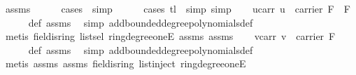 \begin{isabellebody}
\ assms{\isacharparenleft}{\kern0pt}{}{\isacharparenright}{\kern0pt}\isanewline
\ \ \ \ \isamarkupfalse%
\ {\isacharparenleft}{\kern0pt}cases\ {\isasymomega}{\isacharcomma}{\kern0pt}\ simp{\isacharparenright}{\kern0pt}\isanewline
\ \ \ \ \isamarkupfalse%
\ {\isacharparenleft}{\kern0pt}cases\ {\isachardoublequoteopen}{\isacharparenleft}{\kern0pt}tl\ {\isasymomega}{\isacharparenright}{\kern0pt}{\isachardoublequoteclose}{\isacharcomma}{\kern0pt}\ simp{\isacharcomma}{\kern0pt}\ simp{\isacharparenright}{\kern0pt}\isanewline
\isanewline
\ \ \isamarkupfalse%
\ u{\isacharunderscore}{\kern0pt}carr{\isacharcolon}{\kern0pt}\ {\isachardoublequoteopen}u\ {\isasymin}\ carrier\ F\ {\isacharminus}{\kern0pt}\ {\isacharbraceleft}{\kern0pt}{\isasymzero}\isactrlbsub F\isactrlesub {\isacharbraceright}{\kern0pt}{\isachardoublequoteclose}\isanewline
\ \ \ \ \isamarkupfalse%
\ {\isasymomega}{\isacharunderscore}{\kern0pt}def\ assms\ \isamarkupfalse%
\ {\isacharparenleft}{\kern0pt}simp\ add{\isacharcolon}{\kern0pt}bounded{\isacharunderscore}{\kern0pt}degree{\isacharunderscore}{\kern0pt}polynomials{\isacharunderscore}{\kern0pt}def{\isacharparenright}{\kern0pt}\isanewline
\ \ \ \ \isamarkupfalse%
\ {\isacharparenleft}{\kern0pt}metis\ field{\isachardot}{\kern0pt}is{\isacharunderscore}{\kern0pt}ring\ list{\isachardot}{\kern0pt}sel{\isacharparenleft}{\kern0pt}{}{\isacharparenright}{\kern0pt}\ ring{\isachardot}{\kern0pt}degree{\isacharunderscore}{\kern0pt}oneE\ assms{\isacharparenleft}{\kern0pt}{}{\isacharparenright}{\kern0pt}\ assms{\isacharparenleft}{\kern0pt}{}{\isacharparenright}{\kern0pt}{\isacharparenright}{\kern0pt}\isanewline
\isanewline
\ \ \isamarkupfalse%
\ v{\isacharunderscore}{\kern0pt}carr{\isacharcolon}{\kern0pt}\ {\isachardoublequoteopen}v\ {\isasymin}\ carrier\ F{\isachardoublequoteclose}\ \isanewline
\ \ \ \ \isamarkupfalse%
\ {\isasymomega}{\isacharunderscore}{\kern0pt}def\ assms{\isacharparenleft}{\kern0pt}{}{\isacharparenright}{\kern0pt}\ \isamarkupfalse%
\ {\isacharparenleft}{\kern0pt}simp\ add{\isacharcolon}{\kern0pt}bounded{\isacharunderscore}{\kern0pt}degree{\isacharunderscore}{\kern0pt}polynomials{\isacharunderscore}{\kern0pt}def{\isacharparenright}{\kern0pt}\isanewline
\ \ \ \ \isamarkupfalse%
\ {\isacharparenleft}{\kern0pt}metis\ assms{\isacharparenleft}{\kern0pt}{}{\isacharparenright}{\kern0pt}\ assms{\isacharparenleft}{\kern0pt}{}{\isacharparenright}{\kern0pt}\ field{\isachardot}{\kern0pt}is{\isacharunderscore}{\kern0pt}ring\ list{\isachardot}{\kern0pt}inject\ ring{\isachardot}{\kern0pt}degree{\isacharunderscore}{\kern0pt}oneE{\isacharparenright}{\kern0pt}\isanewline

\end{isabellebody}
